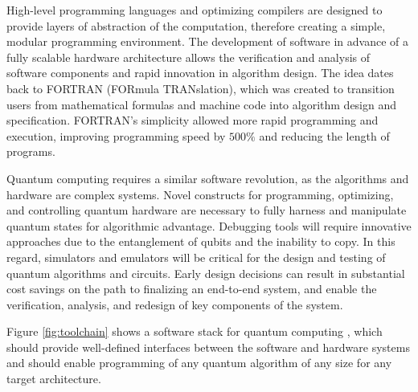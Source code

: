 \documentclass[journal]{IEEEtran}
\begin{document}
 
High-level programming languages and optimizing compilers are designed to provide layers of abstraction of the computation, therefore creating a simple, modular programming environment. The development of software in advance of a fully scalable hardware architecture allows the verification and analysis of software components and rapid innovation in algorithm design.
The idea dates back to FORTRAN (FORmula TRANslation),
 which was created to transition users from mathematical formulas and machine code into algorithm design and specification.  FORTRAN's simplicity allowed more rapid programming and execution, improving programming speed by $500\%$ and reducing the length of programs.%

Quantum computing requires a similar software revolution, as the algorithms and hardware are complex systems.
Novel constructs for programming, optimizing, and controlling quantum hardware are necessary to fully harness and manipulate quantum states for algorithmic advantage. Debugging tools will require innovative approaches due to the entanglement of qubits and the inability to copy.  In this regard, simulators and emulators will be critical for the design and testing of quantum algorithms and circuits. Early design decisions can result in substantial cost savings on the path to finalizing an end-to-end system, and enable the verification, analysis, and redesign of key components of the system.



Figure \ref{fig:toolchain} shows a software stack for quantum computing \cite{stack},
which should provide well-defined interfaces between the software and hardware systems and should enable programming of any quantum algorithm of any size for any target architecture.
\end{document}
